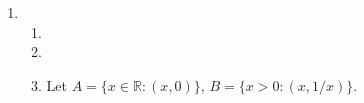 \documentclass{article}
\begin{document}
\begin{enumerate}[label=\textbf{1-\arabic*.}]
\item
\begin{enumerate}
\item
\item
\item Let $A=\{x\in \mathbb R:(x,0)\}$, $B=\{x>0:(x,1/x)\}$.
\end{enumerate}
\end{enumerate}
\end{document}
